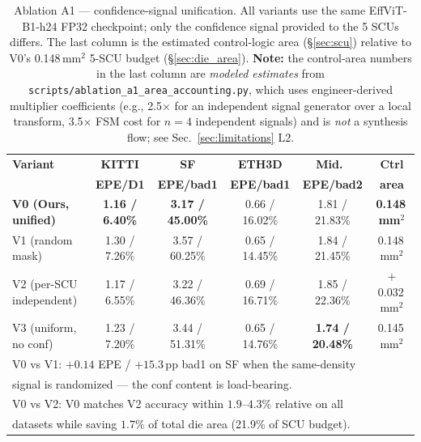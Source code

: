 \begin{table}[tb]
\caption{Ablation A1 --- confidence-signal unification. All variants use the same
EffViT-B1-h24 FP32 checkpoint; only the confidence signal provided to the 5 SCUs
differs. The last column is the estimated control-logic area (\S\ref{sec:scu})
relative to V0's 0.148\,mm$^2$ 5-SCU budget (\S\ref{sec:die_area}).
\textbf{Note:} the control-area numbers in the last column are \emph{modeled estimates}
from \texttt{scripts/ablation\_a1\_area\_accounting.py}, which uses engineer-derived
multiplier coefficients (e.g., 2.5$\times$ for an independent signal generator over a
local transform, 3.5$\times$ FSM cost for $n{=}4$ independent signals) and is \emph{not} a
synthesis flow; see Sec.~\ref{sec:limitations} L2.}
\label{tab:a1}
\centering
\footnotesize
\setlength{\tabcolsep}{3pt}
\begin{tabular}{|l|c|c|c|c|c|}
\hline
\textbf{Variant}
 & \textbf{KITTI}  & \textbf{SF}     & \textbf{ETH3D}  & \textbf{Mid.\ }  & \textbf{Ctrl} \\
 & \textbf{EPE/D1} & \textbf{EPE/bad1} & \textbf{EPE/bad1} & \textbf{EPE/bad2} & \textbf{area} \\
\hline
\textbf{V0 (Ours, unified)}   & \textbf{1.16 / 6.40\%} & \textbf{3.17 / 45.00\%} & 0.66 / 16.02\% & 1.81 / 21.83\% & \textbf{0.148\,mm$^2$} \\
V1 (random mask)              & 1.30 / 7.26\%        & 3.57 / 60.25\%        & 0.65 / 14.45\% & 1.84 / 21.45\% & 0.148\,mm$^2$ \\
V2 (per-SCU independent)      & 1.17 / 6.55\%        & 3.22 / 46.36\%        & 0.69 / 16.71\% & 1.85 / 22.36\% & $+$0.032\,mm$^2$ \\
V3 (uniform, no conf)         & 1.23 / 7.20\%        & 3.44 / 51.31\%        & 0.65 / 14.76\% & \textbf{1.74 / 20.48\%} & 0.145\,mm$^2$ \\
\hline
\multicolumn{6}{|l|}{\footnotesize V0 vs V1: $+0.14$ EPE / $+15.3$\,pp bad1 on SF when the same-density} \\
\multicolumn{6}{|l|}{\footnotesize signal is randomized --- the conf content is load-bearing.} \\
\multicolumn{6}{|l|}{\footnotesize V0 vs V2: V0 matches V2 accuracy within $1.9$--$4.3$\% relative on all} \\
\multicolumn{6}{|l|}{\footnotesize datasets while saving $1.7$\% of total die area (21.9\% of SCU budget).} \\
\hline
\end{tabular}
\end{table}
